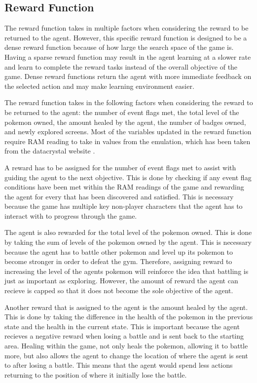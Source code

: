 \subsection{Reward Function}

The reward function takes in multiple factors when considering the reward to be returned to the agent. However, this specific reward function is designed to be a dense reward function because of how large the search space of the game is. Having a sparse reward function may result in the agent learning at a slower rate and learn to complete the reward tasks instead of the overall objective of the game. Dense reward functions return the agent with more immediate feedback on the selected action and may make learning environment easier. 

The reward function takes in the following factors when considering the reward to be returned to the agent: the number of event flags met, the total level of the pokemon owned, the amount healed by the agent, the number of badges owned, and newly explored screens. Most of the variables updated in the reward function require RAM reading to take in values from the emulation, which has been taken from the datacrystal website \cite{datacrystal}.

A reward has to be assigned for the number of event flags met to assist with guiding the agent to the next objective. This is done by checking if any event flag conditions have been met within the RAM readings of the game and rewarding the agent for every that has been discovered and satisfied. This is necessary because the game has multiple key non-player characters that the agent has to interact with to progress through the game. 

The agent is also rewarded for the total level of the pokemon owned. This is done by taking the sum of levels of the pokemon owned by the agent. This is necessary because the agent has to battle other pokemon and level up its pokemon to become stronger in order to defeat the gym. Therefore, assigning reward to increasing the level of the agents pokemon will reinforce the idea that battling is just as important as exploring. However, the amount of reward the agent can recieve is capped so that it does not become the sole objective of the agent. 

Another reward that is assigned to the agent is the amount healed by the agent. This is done by taking the difference in the health of the pokemon in the previous state and the health in the current state. This is important because the agent recieves a negative reward when losing a battle and is sent back to the starting area. Healing within the game, not only heals the pokemon, allowing it to battle more, but also allows the agent to change the location of where the agent is sent to after losing a battle. This means that the agent would spend less actions returning to the position of where it initially lose the battle.

